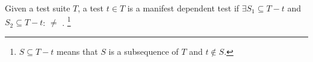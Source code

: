 

\begin{definition} \label{def:manifest}
Given a test suite\/ $T$, a test $t \in T$ is a
manifest dependent test if $\exists {S_1 \subseteq T - t}$
and ${S_2 \subseteq T - t}$:  $\neq$
.
\footnote{$S \subseteq T - t$ means that $S$ is a subsequence of $T$
and $t \notin S$.}
\end{definition}





